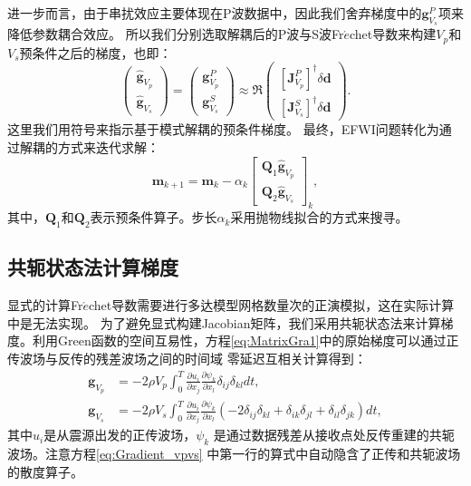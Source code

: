 进一步而言，由于串扰效应主要体现在P波数据中，因此我们舍弃梯度中的$\mathbf{g}_{V_s}^P$项来降低参数耦合效应。
所以我们分别选取解耦后的P波与S波Fr{$\acute{e}$}chet导数来构建$V_p$和$V_s$预条件之后的梯度，也即：
\begin{equation}
        \begin{pmatrix}
                \hat{\mathbf{g}}_{V_p}\\
                \hat{\mathbf{g}}_{V_s}
        \end{pmatrix}=
        \begin{pmatrix}
                \mathbf{g}_{V_p}^P\\
                \mathbf{g}_{V_s}^S
        \end{pmatrix}
        \approx 
        \mathfrak{R}\begin{pmatrix}
                [\mathbf{J}^P_{V_p}]^{\dagger} \delta \mathbf{d}\\
                [\mathbf{J}^S_{V_s}]^{\dagger} \delta \mathbf{d}
        \end{pmatrix}.
        \label{eq:MatrixGraMode}
\end{equation}
这里我们用符号$\hat{}$来指示基于模式解耦的预条件梯度。
最终，EFWI问题转化为通过解耦的方式来迭代求解：
\begin{equation}
        \mathbf{m}_{k+1}=\mathbf{m}_{k}-\alpha_k
        \begin{bmatrix}\mathbf{Q}_1\hat{\mathbf{g}}_{V_p}\\\mathbf{Q}_2\hat{\mathbf{g}}_{V_s}\end{bmatrix}_{k},
        \label{eq:Gradientmethod}
\end{equation}
其中，$\mathbf{Q}_1$和$\mathbf{Q}_2$表示预条件算子。步长$\alpha_k$采用抛物线拟合的方式来搜寻\cite[]{vigh20083d}。

\subsection{共轭状态法计算梯度}
显式的计算Fr{$\acute{e}$}chet导数需要进行多达模型网格数量次的正演模拟，这在实际计算中是无法实现\cite[]{virieux2009overview}。
为了避免显式构建Jacobian矩阵，我们采用共轭状态法来计算梯度\cite[]{tromp2005seismic,plessix2006}。利用Green函数的空间互易性，方程\eqref{eq:MatrixGra1}中的原始梯度可以通过正传波场与反传的残差波场之间的时间域
零延迟互相关计算得到：
\begin{equation} 
        \begin{split}
        \mathbf{g}_{V_p}&=-2\rho V_p\int_{0}^{T}\frac{\partial u_i}{\partial
        x_j}\frac{\partial \psi_k}{\partial x_l}
        \delta_{ij}\delta_{kl}dt,\\
        \mathbf{g}_{V_s}&=-2\rho V_s\int_{0}^{T}\frac{\partial u_i}{\partial
        x_j}\frac{\partial \psi_k}{\partial x_l}
        (-2\delta_{ij}\delta_{kl}+\delta_{ik}\delta_{jl}+\delta_{il}\delta_{jk})dt,
        \end{split}
        \label{eq:Gradient_vpvs}
\end{equation}
其中$u_i$是从震源出发的正传波场，$\psi_k$ 是通过数据残差从接收点处反传重建的共轭波场。注意方程\eqref{eq:Gradient_vpvs}
中第一行的算式中自动隐含了正传和共轭波场的散度算子。

